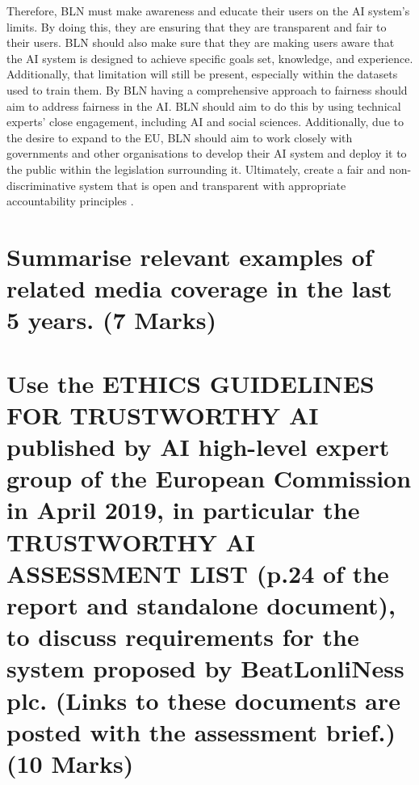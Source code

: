 \documentclass[a4paper,10pt]{article}
\begin{document}
Therefore, BLN must make awareness and educate their users on the AI system's limits. By doing this, they are ensuring that they are transparent and fair to their users. BLN should also make sure that they are making users aware that the AI system is designed to achieve specific goals set, knowledge, and experience.  Additionally, that limitation will still be present, especially within the datasets used to train them. By BLN having a comprehensive approach to fairness should aim to address fairness in the AI. BLN should aim to do this by using technical experts' close engagement, including AI and social sciences. Additionally, due to the desire to expand to the EU, BLN should aim to work closely with governments and other organisations to develop their AI system and deploy it to the public within the legislation surrounding it. Ultimately, create a fair and non-discriminative system that is open and transparent with appropriate accountability principles \cite{adam_slides_regulating_ai}.


\section{Summarise relevant examples of related media coverage in the last 5 years. (7 Marks)}


	

\section{Use the ETHICS GUIDELINES FOR TRUSTWORTHY AI published by AI high-level expert group of the European Commission in April 2019, in particular the TRUSTWORTHY AI ASSESSMENT LIST (p.24 of the report and standalone document), to discuss requirements for the system proposed by BeatLonliNess plc. (Links to these documents are posted with the assessment brief.) (10 Marks)}

	
\medskip
\newpage
	
	




\end{document}
